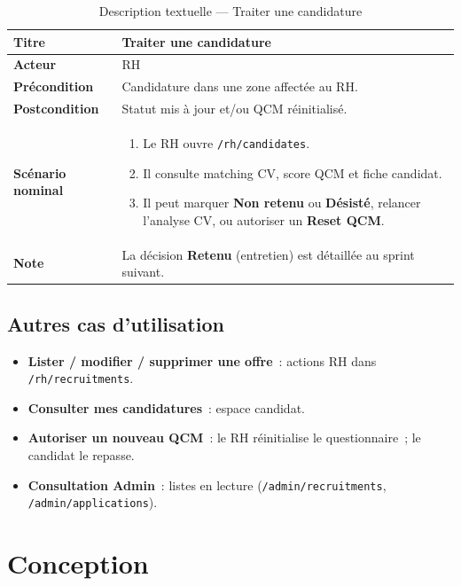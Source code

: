 \begin{table}[htbp]
  \centering
  \small
  \caption{Description textuelle --- Traiter une candidature}
  \label{tab:uc-process-app}
  \begin{tabular}{|p{3.0cm}|p{10.2cm}|}
    \hline
    \textbf{Titre} & Traiter une candidature \\
    \hline
    \textbf{Acteur} & RH \\
    \hline
    \textbf{Précondition} & Candidature dans une zone affectée au RH. \\
    \hline
    \textbf{Postcondition} & Statut mis à jour et/ou QCM réinitialisé. \\
    \hline
    \textbf{Scénario nominal}
    &
    \begin{enumerate}[leftmargin=*,itemsep=0.15em,topsep=0.2em]
      \item Le RH ouvre \texttt{/rh/candidates}.
      \item Il consulte matching CV, score QCM et fiche candidat.
      \item Il peut marquer \textbf{Non retenu} ou \textbf{Désisté},
            relancer l'analyse CV, ou autoriser un \textbf{Reset QCM}.
    \end{enumerate}
    \\
    \hline
    \textbf{Note} & La décision \textbf{Retenu} (entretien) est détaillée au sprint suivant. \\
    \hline
  \end{tabular}
\end{table}


\subsection{Autres cas d'utilisation}

\begin{itemize}
  \item \textbf{Lister / modifier / supprimer une offre}~: actions RH
        dans \texttt{/rh/recruitments}.
  \item \textbf{Consulter mes candidatures}~: espace candidat.
  \item \textbf{Autoriser un nouveau QCM}~: le RH réinitialise le
        questionnaire~; le candidat le repasse.
  \item \textbf{Consultation Admin}~: listes en lecture
        (\texttt{/admin/recruitments}, \texttt{/admin/applications}).
\end{itemize}


\section{Conception}

